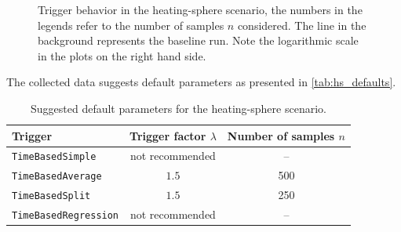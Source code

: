 \begin{figure}[htpb]
\begin{subfigure}{0.45\textwidth}
	\end{subfigure}%
	\hspace{0.05\textwidth}
	\begin{subfigure}{0.45\textwidth}
	\end{subfigure}%
	\caption{Trigger behavior in the heating-sphere scenario, the numbers in the legends refer to the number of samples $n$ considered. The line in the background represents the baseline run. Note the logarithmic scale in the plots on the right hand side.}
	\label{fig:params_hs}
\end{figure}

The collected data suggests default parameters as presented in \autoref{tab:hs_defaults}.
\begin{table}[htpb]
	\centering
	\begin{tabular}{lcc}
		\toprule
		\textbf{Trigger}             & \textbf{Trigger factor $\lambda$} & \textbf{Number of samples $n$} \\ [0em]
		\midrule
		\texttt{TimeBasedSimple}     & not recommended                   & --                             \\
		\texttt{TimeBasedAverage}    & $1.5$                             & 500                            \\
		\texttt{TimeBasedSplit}      & $1.5$                             & 250                            \\
		\texttt{TimeBasedRegression} & not recommended                   & --                             \\
		\bottomrule
	\end{tabular}
	\caption{Suggested default parameters for the heating-sphere scenario.}
	\label{tab:hs_defaults}
\end{table}



